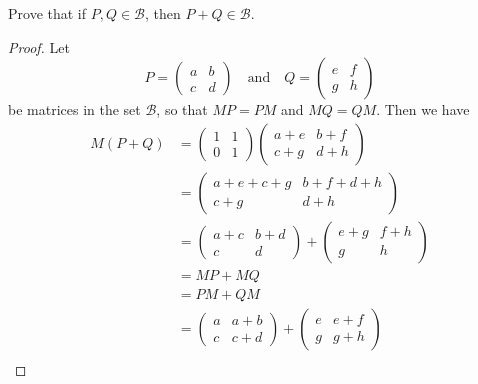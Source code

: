 Prove that if $P, Q \in\mathcal{B}$, then
$P + Q\in\mathcal{B}$.
\begin{proof}
  Let
  \begin{equation*}
    P = \begin{pmatrix}
      a & b \\ c & d
    \end{pmatrix}
    \quad\text{and}\quad
    Q = \begin{pmatrix}
      e & f \\ g & h
    \end{pmatrix}
  \end{equation*}
  be matrices in the set $\mathcal{B}$, so that $MP = PM$ and
  $MQ = QM$. Then we have
  \begin{align*}
    M(P + Q) &= \begin{pmatrix} 1 & 1 \\ 0 & 1 \end{pmatrix}
                \begin{pmatrix} a + e & b + f \\ c + g & d + h \end{pmatrix} \\
             &= \begin{pmatrix}
               a + e + c + g & b + f + d + h \\
               c + g & d + h
             \end{pmatrix} \\
             &= \begin{pmatrix}
               a + c & b + d \\
               c & d
             \end{pmatrix}
                   + \begin{pmatrix}
                     e + g & f + h \\
                     g & h
                   \end{pmatrix} \\
             &= MP + MQ \\
             &= PM + QM \\
             &= \begin{pmatrix}
               a & a + b \\
               c & c + d
             \end{pmatrix}
                   + \begin{pmatrix}
                     e & e + f \\
                     g & g + h
                   \end{pmatrix} \\

\end{align*}
\end{proof}
